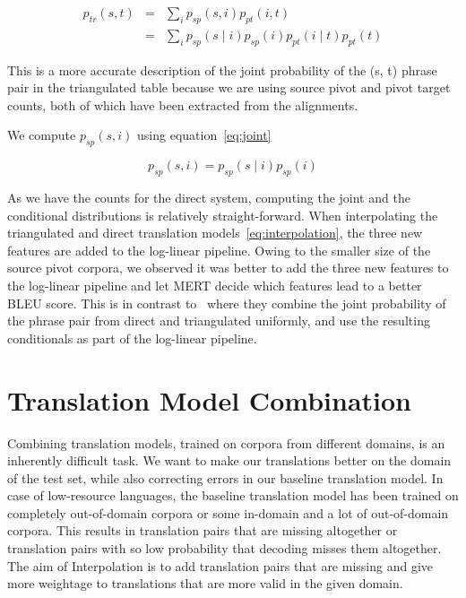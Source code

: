         \begin{eqnarray*}
                p_{tr}(s, t) &=& \sum_{i}p_{sp}(s, i) p_{pt}(i, t) \\
                                &=& \sum_{i}p_{sp}(s \mid i) p_{sp}(i) p_{pt}(i \mid t) p_{pt}(t)
        \end{eqnarray*}



This is a more accurate description of the joint probability of the (s, t) phrase pair in the triangulated table because we are using source pivot and pivot target counts, both of which have been extracted from the alignments.

We compute $p_{sp}(s, i)$ using equation~\eqref{eq:joint} 

\begin{equation} \label{eq:joint}
	p_{sp}(s, i) = p_{sp}(s \mid i) p_{sp}(i)
\end{equation}

	

 As we have the counts for the direct system, computing the joint and the conditional distributions is relatively straight-forward. When interpolating the triangulated and direct translation models~\eqref{eq:interpolation}, the three new features are added to the log-linear pipeline. Owing to the smaller size of the source pivot corpora, we observed it was better to add the three new features to the log-linear pipeline and let MERT decide which features lead to a better BLEU score. This is in contrast to~\cite{Cohn:07} where they combine the joint probability of the phrase pair from direct and triangulated uniformly, and use the resulting conditionals as part of the log-linear pipeline.


\section{Translation Model Combination}
\label{sec:interpolation}
Combining translation models, trained on corpora from different domains, is an inherently difficult task. We want to make our translations better on the domain of the test set, while also correcting errors in our baseline translation model. In case of low-resource languages, the baseline translation model has been trained on completely out-of-domain corpora or some in-domain and a lot of out-of-domain corpora. This results in translation pairs that are missing altogether or translation pairs with so low probability that decoding misses them altogether. The aim of Interpolation is to add translation pairs that are missing and give more weightage to translations that are more valid in the given domain. 

